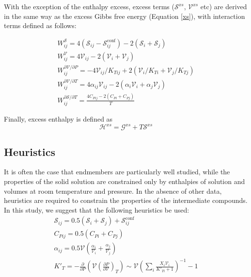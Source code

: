 \documentclass[review]{elsarticle}
\begin{document}
With the exception of the enthalpy excess, excess terms ($\mathcal{S}^{xs}$, $\mathcal{V}^{xs}$ etc) are derived in the same way as the excess Gibbs free energy (Equation \ref{xs}), with interaction terms defined as follows:

\begin{eqnarray}
  W^{\mathcal{S}}_{ij} = 4 (\mathcal{S}_{ij} - \mathcal{S}^{\textrm{conf}}_{ij}) - 2(\mathcal{S}_i + \mathcal{S}_j) \\
  W^{\mathcal{V}}_{ij} = 4 \mathcal{V}_{ij} - 2(\mathcal{V}_i + \mathcal{V}_j) \\
  W^{\partial\mathcal{V}/\partial P}_{ij} = -4 \mathcal{V}_{ij}/K_{T{ij}} + 2(\mathcal{V}_{i}/K_{T{i}} + \mathcal{V}_{j}/K_{T{j}}) \\
  W^{\partial\mathcal{V}/\partial T}_{ij} = 4 \alpha_{ij} \mathcal{V}_{ij} - 2(\alpha_{i} \mathcal{V}_i + \alpha_{j} \mathcal{V}_j) \\
  W^{\partial\mathcal{S}/\partial T}_{ij} = \frac{4 C_{P{ij}} - 2(C_{P{i}} + C_{P{j}})}{T} 
\end{eqnarray}

Finally, excess enthalpy is defined as
\begin{equation}
 \mathcal{H}^{xs} = \mathcal{G}^{xs} + T\mathcal{S}^{xs}
\end{equation}

\subsection{Heuristics}
It is often the case that endmembers are particularly well studied, while the properties of the solid solution are constrained only by enthalpies of solution and volumes at room temperature and pressure. In the absence of other data, heuristics are required to constrain the properties of the intermediate compounds. In this study, we suggest that the following heuristics be used:
\begin{eqnarray}
  \mathcal{S}_{ij} = 0.5(\mathcal{S}_i + \mathcal{S}_j) + \mathcal{S}^{\textrm{conf}}_{ij} \\
  C_{P{ij}} = 0.5(C_{P{i}} + C_{P{j}}) \\
  \alpha_{ij} = 0.5 \mathcal{V} \left(\frac{\alpha_i}{\mathcal{V}_i} + \frac{\alpha_j}{\mathcal{V}_j}\right)\\
  K'_{T} = -\frac{\partial}{\partial P} \left (\mathcal{V}\left( \frac{\partial P}{\partial \mathcal{V}} \right)_T \right) \sim \mathcal{V} \left(\sum_i \frac{X_i \mathcal{V}_i}{K'_{Ti} + 1} \right)^{-1} - 1
\end{eqnarray}
\end{document}
